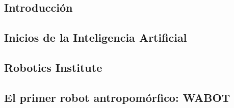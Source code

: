 \documentclass[a4paper,10pt]{article}
\begin{document}
\subsection{Introducción}


\subsection{Inicios de la Inteligencia Artificial}


\subsection{Robotics Institute}


\subsection{El primer robot antropomórfico: WABOT}



\normalsize


\onecolumn


\nocite{*}
\end{document}
